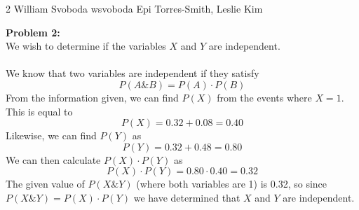 \documentclass[12pt,letterpaper]{cos340hw}
\begin{document}
           {2}            %
           {William Svoboda}  %
           {wsvoboda}   %
           {Epi Torres-Smith, Leslie Kim} 




\noindent\textbf{Problem 2:}\\
We wish to determine if the variables $X$ and $Y$ are independent.\\\\
We know that two variables are independent if they satisfy
$$P(A\&B)=P(A)\cdot P(B)$$
From the information given, we can find $P(X)$ from the events where $X=1$. This is equal to
$$P(X)=0.32+0.08=0.40$$
Likewise, we can find $P(Y)$ as
$$P(Y)=0.32+0.48=0.80$$
We can then calculate $P(X)\cdot P(Y)$ as
$$P(X)\cdot P(Y)=0.80\cdot0.40=0.32$$
The given value of $P(X\&Y)$ (where both variables are 1) is 0.32, so since\\ $P(X\&Y)=P(X)\cdot P(Y)$ 
we have determined that $X$ and $Y$ are independent.


\end{document}
